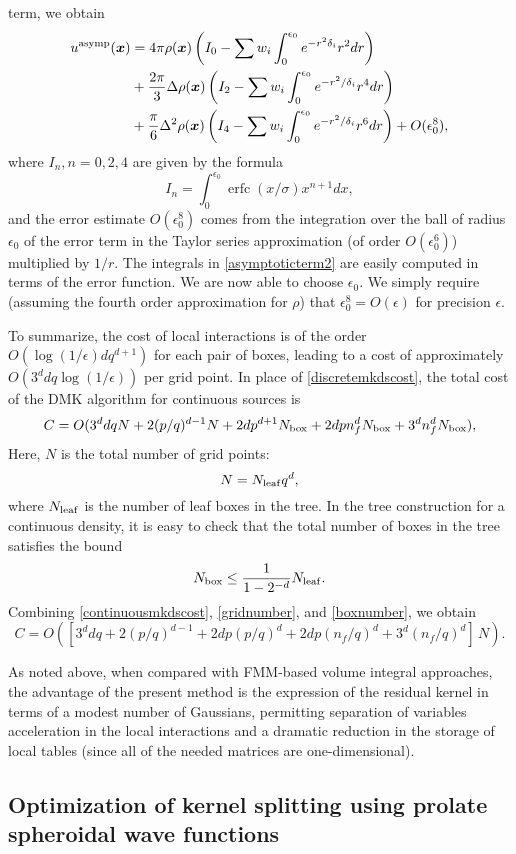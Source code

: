 \documentclass[final,letterpaper]{siamart171218}
\DeclareMathOperator\erfc{erfc}
\newcommand{\be}{\begin{equation}}
\newcommand{\ee}{\end{equation}}
\newcommand{\ba}{\begin{aligned}}
\newcommand{\ea}{\end{aligned}}
\newcommand{\x}{\boldsymbol{x}}
\newcommand{\acron}{DMK }
\begin{document}
term, we obtain
\be\label{asymptoticterm2}
\ba
u^{\rm asymp}(\x) &= 4\pi \rho(\x) \left(I_0 - \sum w_i \int_0^{\epsilon_0}e^{-r^2\delta_i}r^2dr\right) \\
&+\frac{2\pi}{3} \Delta \rho(\x)
\left(I_2 - \sum w_i \int_0^{\epsilon_0}e^{-r^2/\delta_i}r^4dr\right) \\
&+\frac{\pi}{6} \Delta^2 \rho(\x)
\left(I_4 - \sum w_i \int_0^{\epsilon_0}e^{-r^2/\delta_i}r^6dr\right) +O(\epsilon_0^8),
\ea
\ee
where $I_n, n=0,2,4$ are given by the formula
\be
I_n=\int_0^{\epsilon_0} \erfc(x/\sigma)x^{n+1} dx,
\ee
and the error estimate $O(\epsilon_0^8)$ comes from the integration over the ball of radius $\epsilon_0$
of the error term in the Taylor series approximation (of order $O(\epsilon_0^6)$) multiplied
by $1/r$. 
The integrals in \eqref{asymptoticterm2} are easily computed in terms of the error function.
We are now able to choose $\epsilon_0$. We simply require (assuming the fourth order
approximation for $\rho$) that $\epsilon_0^8 = O(\epsilon)$ for
precision $\epsilon$.

To summarize, the cost of local interactions is of the order $O(\log(1/\epsilon) dq^{d+1})$
for each pair of boxes, leading to a cost of approximately
$O(3^d d q\log(1/\epsilon))$ per grid point.
In place of \cref{discretemkdscost}, the total
cost of the \acron algorithm for continuous sources is
\be\label{continuousmkdscost}
C=O(3^d dq N + 2(p/q)^{d-1} N + 2d p^{d+1} N_{\rm box} + 2d p n_f^d N_{\rm box} + 3^d n_f^d N_{\rm box}),
\ee
Here, $N$ is the total number of grid points:
\be\label{gridnumber}
N= N_{\rm leaf} q^d,
\ee
where $N_{\rm leaf}$ is the number of leaf boxes in the tree. In the tree construction
for a continuous density, it is easy to check that
the total number of boxes in the tree satisfies the bound
\be\label{boxnumber}
N_{\rm box}\le \frac{1}{1-2^{-d}}N_{\rm leaf}.
\ee
Combining \cref{continuousmkdscost}, \cref{gridnumber}, and \cref{boxnumber}, we obtain
\be\label{continuousmkdscost2}
C=O([3^d dq + 2(p/q)^{d-1} + 2d p (p/q)^{d} + 2d p (n_f/q)^d + 3^d (n_f/q)^d] \, N).
\ee

As noted above,
when compared with FMM-based volume integral approaches, the advantage of the 
present method is the expression of the residual kernel in terms of a modest
number of Gaussians,
permitting separation of variables acceleration in the local interactions and a dramatic
reduction in the storage of local tables (since all of the needed matrices are one-dimensional).

\subsection{Optimization of kernel splitting using prolate spheroidal wave functions}
\label{sec:betterkernelsplitting}
\end{document}
